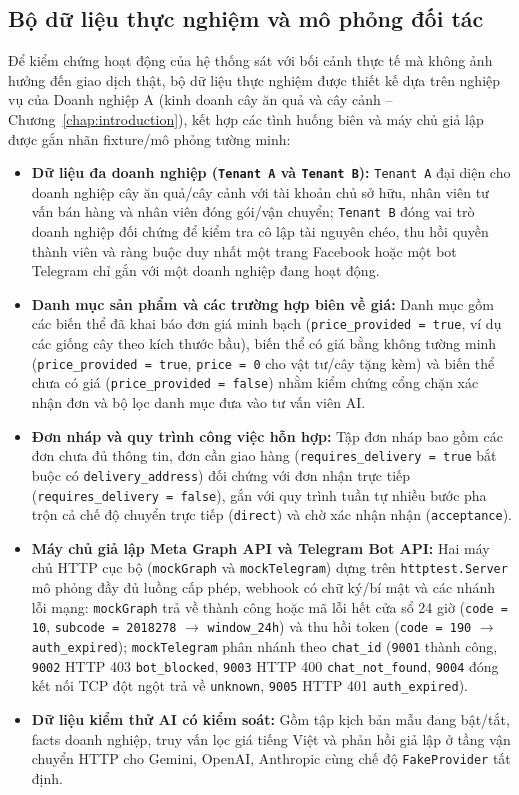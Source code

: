 \subsection{Bộ dữ liệu thực nghiệm và mô phỏng đối tác}
Để kiểm chứng hoạt động của hệ thống sát với bối cảnh thực tế mà không ảnh hưởng đến giao dịch thật, bộ dữ liệu thực nghiệm được thiết kế dựa trên nghiệp vụ của Doanh nghiệp A
(kinh doanh cây ăn quả và cây cảnh -- Chương~\ref{chap:introduction}), kết hợp các tình huống biên và máy chủ giả lập được gắn nhãn fixture/mô phỏng tường minh:
\begin{itemize}
  \item \textbf{Dữ liệu đa doanh nghiệp (\texttt{Tenant A} và \texttt{Tenant B}):} \texttt{Tenant A} đại diện cho doanh nghiệp cây ăn quả/cây cảnh với tài khoản chủ sở hữu,
    nhân viên tư vấn bán hàng và nhân viên đóng gói/vận chuyển;
  \texttt{Tenant B} đóng vai trò doanh nghiệp đối chứng để kiểm tra cô lập tài nguyên chéo, thu hồi quyền thành viên và ràng buộc duy nhất một trang Facebook hoặc một bot Telegram chỉ gắn với một doanh nghiệp đang hoạt động.
  \item \textbf{Danh mục sản phẩm và các trường hợp biên về giá:} Danh mục gồm các biến thể đã khai báo đơn giá minh bạch (\texttt{price\_provided = true}, ví dụ các giống cây theo kích thước bầu),
  biến thể có giá bằng không tường minh (\texttt{price\_provided = true}, \texttt{price = 0} cho vật tư/cây tặng kèm) và biến thể chưa có giá (\texttt{price\_provided =
  false}) nhằm kiểm chứng cổng chặn xác nhận đơn và bộ lọc danh mục đưa vào tư vấn viên AI.
  \item \textbf{Đơn nháp và quy trình công việc hỗn hợp:} Tập đơn nháp bao gồm các đơn chưa đủ thông tin, đơn cần giao hàng (\texttt{requires\_delivery = true} bắt buộc có
    \texttt{delivery\_address}) đối chứng với đơn nhận trực tiếp (\texttt{requires\_delivery = false}),
  gắn với quy trình tuần tự nhiều bước pha trộn cả chế độ chuyển trực tiếp (\texttt{direct}) và chờ xác nhận nhận (\texttt{acceptance}).
  \item \textbf{Máy chủ giả lập Meta Graph API và Telegram Bot API:} Hai máy chủ HTTP cục bộ (\texttt{mockGraph} và \texttt{mockTelegram}) dựng trên \texttt{httptest.Server}
    mô phỏng đầy đủ luồng cấp phép, webhook có chữ ký/bí mật và các nhánh lỗi mạng:
  \texttt{mockGraph} trả về thành công hoặc mã lỗi hết cửa sổ 24 giờ (\texttt{code = 10}, \texttt{subcode = 2018278} $\rightarrow$ \texttt{window\_24h}) và thu hồi token (\texttt{code = 190} $\rightarrow$ \texttt{auth\_expired});
  \texttt{mockTelegram} phân nhánh theo \texttt{chat\_id} (\texttt{9001} thành công, \texttt{9002} HTTP 403 \texttt{bot\_blocked}, \texttt{9003} HTTP 400 \texttt{chat\_not\_found}, \texttt{9004} đóng kết nối TCP đột ngột trả về \texttt{unknown}, \texttt{9005} HTTP 401 \texttt{auth\_expired}).
  \item \textbf{Dữ liệu kiểm thử AI có kiểm soát:} Gồm tập kịch bản mẫu đang bật/tắt, facts doanh nghiệp, truy vấn lọc giá tiếng Việt và phản hồi giả lập ở tầng vận chuyển
    HTTP cho Gemini, OpenAI, Anthropic cùng chế độ \texttt{FakeProvider} tất định.
\end{itemize}

